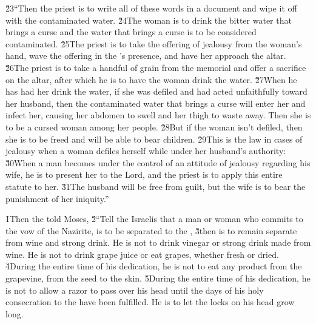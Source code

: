 \v{23}``Then the priest is to write all of these words in a document and wipe it off with the contaminated water. \v{24}The woman is to drink the bitter water that brings a curse and the water that brings a curse is to be considered contaminated. \v{25}The priest is to take the offering of jealousy from the woman's hand, wave the offering in the 's presence, and have her approach the altar. \v{26}The priest is to take a handful of grain from the memorial and offer a sacrifice on the altar, after which he is to have the woman drink the water. \v{27}When he has had her drink the water, if she was defiled and had acted unfaithfully toward her husband, then the contaminated water that brings a curse will enter her and infect her, causing her abdomen to swell and her thigh to waste away. Then she is to be a cursed woman among her people. \v{28}But if the woman isn't defiled, then she is to be freed and will be able to bear children. \v{29}This is the law in cases of jealousy when a woman defiles herself while under her husband's authority: \v{30}When a man becomes under the control of an attitude of jealousy regarding his wife, he is to present her to the Lord, and the priest is to apply this entire statute to her. \v{31}The husband will be free from guilt, but the wife is to bear the punishment of her iniquity.''

\v{1}Then the  told Moses, \v{2}``Tell the Israelis that a man or woman who commits to the vow of the Nazirite, is to be separated to the , \v{3}then is to remain separate from wine and strong drink. He is not to drink vinegar or strong drink made from wine. He is not to drink grape juice or eat grapes, whether fresh or dried. \v{4}During the entire time of his dedication, he is not to eat any product from the grapevine, from the seed to the skin. \v{5}During the entire time of his dedication, he is not to allow a razor to pass over his head until the days of his holy consecration to the  have been fulfilled. He is to let the locks on his head grow long.

